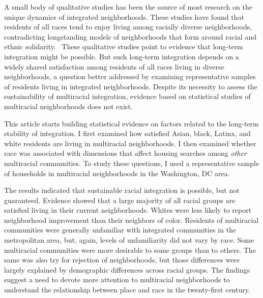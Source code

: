 \documentclass{baderart}
\renewcommand{\needcite}[1][]{%
	\strong{[CITE: %
		\ifthenelse{\equal{#1}{}}{}{: #1}	%
	]}}
\begin{document}
A small body of qualitative studies has been the source of most research on the unique dynamics of integrated neighborhoods. These studies have found that residents of all races tend to enjoy living among racially diverse neighborhoods, contradicting longstanding models of neighborhoods that form around racial and ethnic solidarity.\needcite\ These qualitative studies point to evidence that long-term integration might be possible. But such long-term integration depends on a widely shared satisfaction among residents of all races living in diverse neighborhoods, a question better addressed by examining representative samples of residents living in integrated neighborhoods. Despite its necessity to assess the sustainability of multiracial integration, evidence based on statistical studies of multiracial neighborhoods does not exist. 

This article starts building statistical evidence on factors related to the long-term stability of integration. I first examined how satisfied Asian, black, Latinx, and white residents are living in multiracial neighborhoods. I then examined whether race was associated with dimensions that affect housing searches among \emph{other} multiracial communities. To study these questions, I used a representative sample of households in multiracial neighborhoods in the Washington, DC area. 

The results indicated that sustainable racial integration is possible, but not guaranteed. Evidence showed that a large majority of all racial groups are satisfied living in their current neighborhoods. Whites were less likely to report neighborhood improvement than their neighbors of color. Residents of multiracial communities were generally unfamiliar with integrated communities in the metropolitan area, but, again, levels of unfamiliarity did not vary by race. Some multiracial communities were more desirable to some groups than to others. The same was also try for rejection of neighborhoods, but those differences were largely explained by demographic differences across racial groups. The findings suggest a need to devote more attention to multiracial neighborhoods to understand the relationship between place and race in the twenty-first century. 
\end{document}
